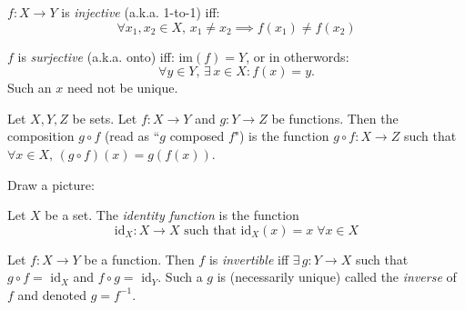 \documentclass[twoside]{scrartcl}
\begin{document}
\begin{definition}
$f: X \to Y$ is \emph{injective} (a.k.a. 1-to-1) iff: 
\[\forall x_1,x_2 \in X,\, x_1 \neq x_2 \implies f(x_1) \neq f(x_2)\]	

$f$ is \emph{surjective} (a.k.a. onto) iff: im$(f) = Y$, or in otherwords: 
\[\forall y \in Y,\, \exists\,x \in X: f(x) = y.\]
Such an $x$ need not be unique. 	
\end{definition}\vspace*{10pt}


\begin{definition}
Let $X,Y,Z$ be sets. Let $f: X \to Y$ and $g: Y \to Z$ be functions. Then the composition $g \circ f$ (read as ``$g$ composed $f$") is the function $g \circ f: X\to Z$ such that $\forall x \in X,\, (g \circ f)(x) = g(f(x))$. 
\end{definition}

Draw a picture: 
\begin{center}
\end{center}

\begin{definition}
Let $X$ be a set. The \emph{identity function} is the function 
\[\text{id}_X: X \to X \text{ such that } \text{id}_X(x) = x\; \forall x \in X\]
\end{definition}\vspace*{5pt}

\begin{definition}
Let $f: X \to Y$ be a function. Then $f$ is \emph{invertible} iff $\exists\, g: Y \to X$ such that $g \circ f = \text{ id}_X$ and $f \circ g = \text{ id}_Y$. Such a $g$ is (necessarily unique) called the \emph{inverse} of $f$ and denoted $g = f^{-1}$. 
\end{definition}\vspace*{5pt}
\end{document}
